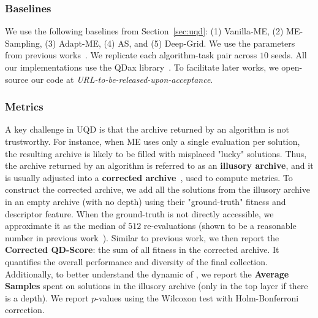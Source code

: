 \subsubsection{Baselines} We use the following baselines from Section~\ref{sec:uqd}: (1) Vanilla-ME, (2) ME-Sampling, (3) Adapt-ME, (4) AS, and (5) Deep-Grid. We use the parameters from previous works~\cite{flageat2023uncertain, flageat2024exploring}. We replicate each algorithm-task pair across $10$ seeds. 
All our implementations use the QDax library~\cite{chalumeau2024qdax, lim2022accelerated}.
To facilitate later works, we open-source our code at \textit{URL-to-be-released-upon-acceptance}.


\subsubsection{Metrics}
A key challenge in UQD is that the archive returned by an algorithm is not trustworthy. For instance, when ME uses only a single evaluation per solution, the resulting archive is likely to be filled with misplaced "lucky" solutions. Thus, the archive returned by an algorithm is referred to as an \textbf{illusory archive}, and it is usually adjusted into a \textbf{corrected archive}~\cite{adaptive}, used to compute metrics. To construct the corrected archive, we add all the solutions from the illusory archive in an empty archive (with no depth) using their "ground-truth" fitness and descriptor feature. 
When the ground-truth is not directly accessible, we approximate it as the median of $512$ re-evaluations (shown to be a reasonable number in previous work~\cite{flageat2023uncertain}). 
Similar to previous work, we then report the \textbf{Corrected QD-Score}: the sum of all fitness in the corrected archive. It quantifies the overall performance and diversity of the final collection. 
Additionally, to better understand the dynamic of \name{}, we report the \textbf{Average Samples} spent on solutions in the illusory archive (only in the top layer if there is a depth). 
We report $p$-values using the Wilcoxon test with Holm-Bonferroni correction. 



